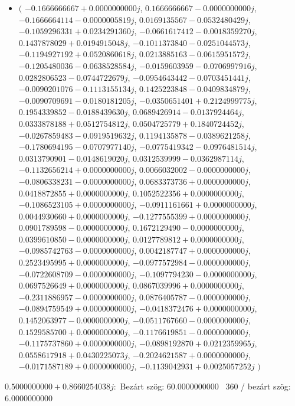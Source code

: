 \documentclass[14pt,a4paper]{article}
\begin{document}
\begin{itemize}
\item
$\big($
$-0.1666666667+0.0000000000j$, $0.1666666667-0.0000000000j$, $-0.1666664114-0.0000005819j$, $0.0169135567-0.0532480429j$, $-0.1059296331+0.0234291360j$, $-0.0661617412-0.0018359270j$, $0.1437878029+0.0194915048j$, $-0.1011373840-0.0251044573j$, $-0.1194927192+0.0520860618j$, $0.0213885163-0.0615951572j$, $-0.1205480036-0.0638528584j$, $-0.0159603959-0.0706997916j$, $0.0282806523-0.0744722679j$, $-0.0954643442-0.0703451441j$, $-0.0090201076-0.1113155134j$, $0.1425223848-0.0409834879j$, $-0.0090709691-0.0180181205j$, $-0.0350651401+0.2124999775j$, $0.1954339852-0.0188439630j$, $0.0689426914-0.0137924464j$, $0.0333878188+0.0512754812j$, $0.0504725779+0.1840724452j$, $-0.0267859483-0.0919519632j$, $0.1194135878-0.0389621258j$, $-0.1780694195-0.0707977140j$, $-0.0775419342-0.0976481514j$, $0.0313790901-0.0148619020j$, $0.0312539999-0.0362987114j$, $-0.1132656214+0.0000000000j$, $0.0066032002-0.0000000000j$, $-0.0806338231-0.0000000000j$, $0.0683373736+0.0000000000j$, $0.0418872855+0.0000000000j$, $0.1052522356+0.0000000000j$, $-0.1086523105+0.0000000000j$, $-0.0911161661+0.0000000000j$, $0.0044930660+0.0000000000j$, $-0.1277555399+0.0000000000j$, $0.0901789598-0.0000000000j$, $0.1672129490-0.0000000000j$, $0.0399610850-0.0000000000j$, $0.0127789812+0.0000000000j$, $-0.0985742763-0.0000000000j$, $0.0042187747+0.0000000000j$, $0.2523495995+0.0000000000j$, $-0.0977572984-0.0000000000j$, $-0.0722608709-0.0000000000j$, $-0.1097794230-0.0000000000j$, $0.0697526649+0.0000000000j$, $0.0867039996+0.0000000000j$, $-0.2311886957-0.0000000000j$, $0.0876405787-0.0000000000j$, $-0.0894759549+0.0000000000j$, $-0.0418372476+0.0000000000j$, $0.1452063977-0.0000000000j$, $-0.0511767660-0.0000000000j$, $0.1529585700+0.0000000000j$, $-0.1176619851-0.0000000000j$, $-0.1175737860+0.0000000000j$, $-0.0898192870+0.0212359965j$, $0.0558617918+0.0430225073j$, $-0.2024621587+0.0000000000j$, $-0.0171587189+0.0000000000j$, $-0.1139042931+0.0025057252j$
$\big)$
\end{itemize}
$0.5000000000+0.8660254038j$:\
Bezárt szög: $60.0000000000$ \
360 / bezárt szög: $6.0000000000$\
\end{document}

